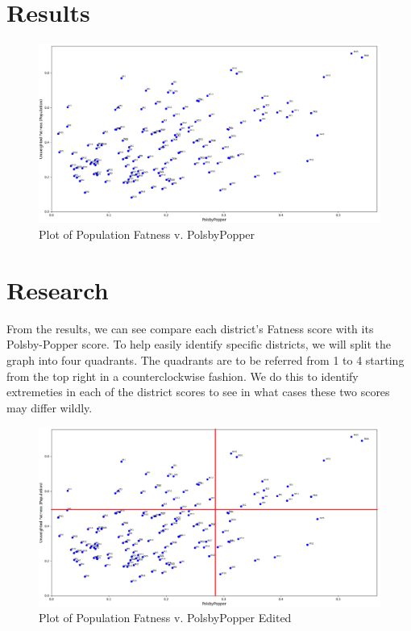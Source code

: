 \documentclass[letterpaper]{article}
\begin{document}
\section{Results}

\begin{figure}[H]
	\includegraphics[width=\linewidth]{./figures/fatnessPopulationVpolsbyPopper.png}
	\caption{Plot of Population Fatness v. PolsbyPopper}
	\label{fig:datapoints}
\end{figure}

\section{Research}
From the results, we can see compare each district's Fatness score with its Polsby-Popper score. To help easily identify specific districts, we will split the graph into four quadrants. The quadrants are to be referred from 1 to 4 starting from the top right in a counterclockwise fashion. We do this to identify extremeties in each of the district scores to see in what cases these two scores may differ wildly.

\begin{figure}[H]
	\includegraphics[width=\linewidth]{./figures/fatnessPopulationVpolsbyPopperEdited.png}
	\caption{Plot of Population Fatness v. PolsbyPopper Edited}
	\label{fig:datapointsEdited}
\end{figure}
\end{document}
